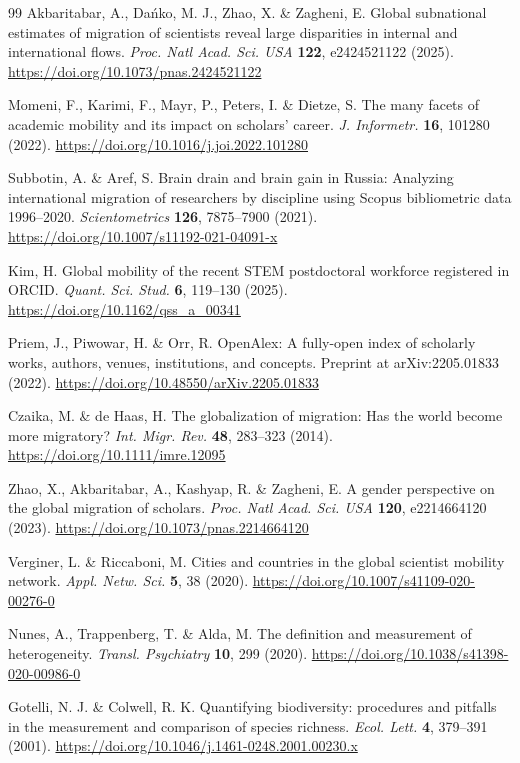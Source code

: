 \begin{thebibliography}{99}
Akbaritabar, A., Dańko, M. J., Zhao, X. \& Zagheni, E. Global subnational estimates of migration of scientists reveal large disparities in internal and international flows. \textit{Proc. Natl Acad. Sci. USA} \textbf{122}, e2424521122 (2025). \url{https://doi.org/10.1073/pnas.2424521122}

Momeni, F., Karimi, F., Mayr, P., Peters, I. \& Dietze, S. The many facets of academic mobility and its impact on scholars’ career. \textit{J. Informetr.} \textbf{16}, 101280 (2022). \url{https://doi.org/10.1016/j.joi.2022.101280}

Subbotin, A. \& Aref, S. Brain drain and brain gain in Russia: Analyzing international migration of researchers by discipline using Scopus bibliometric data 1996--2020. \textit{Scientometrics} \textbf{126}, 7875--7900 (2021). \url{https://doi.org/10.1007/s11192-021-04091-x}

Kim, H. Global mobility of the recent STEM postdoctoral workforce registered in ORCID. \textit{Quant. Sci. Stud.} \textbf{6}, 119--130 (2025). \url{https://doi.org/10.1162/qss_a_00341}

Priem, J., Piwowar, H. \& Orr, R. OpenAlex: A fully-open index of scholarly works, authors, venues, institutions, and concepts. Preprint at arXiv:2205.01833 (2022). \url{https://doi.org/10.48550/arXiv.2205.01833}

Czaika, M. \& de Haas, H. The globalization of migration: Has the world become more migratory? \textit{Int. Migr. Rev.} \textbf{48}, 283--323 (2014). \url{https://doi.org/10.1111/imre.12095}

Zhao, X., Akbaritabar, A., Kashyap, R. \& Zagheni, E. A gender perspective on the global migration of scholars. \textit{Proc. Natl Acad. Sci. USA} \textbf{120}, e2214664120 (2023). \url{https://doi.org/10.1073/pnas.2214664120}

Verginer, L. \& Riccaboni, M. Cities and countries in the global scientist mobility network. \textit{Appl. Netw. Sci.} \textbf{5}, 38 (2020). \url{https://doi.org/10.1007/s41109-020-00276-0}

Nunes, A., Trappenberg, T. \& Alda, M. The definition and measurement of heterogeneity. \textit{Transl. Psychiatry} \textbf{10}, 299 (2020). \url{https://doi.org/10.1038/s41398-020-00986-0}

Gotelli, N. J. \& Colwell, R. K. Quantifying biodiversity: procedures and pitfalls in the measurement and comparison of species richness. \textit{Ecol. Lett.} \textbf{4}, 379--391 (2001). \url{https://doi.org/10.1046/j.1461-0248.2001.00230.x}


\end{thebibliography}
